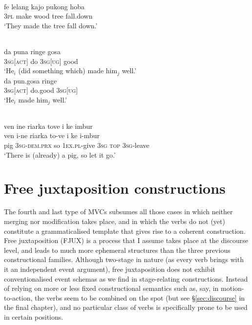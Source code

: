\ea \label{Alorese_15}
\\
\gll fe lelang kajo pukong hoba \\
3\textsc{pl} make wood tree fall.down \\
\glft `They made the tree fall down.'\\ 
\z

\ea
{}\\
\ea \label{Buru_24}
\gll da puna ringe gosa \\
3\textsc{sg}[\textsc{act}] do 3\textsc{sg}[\textsc{ug}] good \\
\glft `He$_i$ (did something which) made him$_j$ well.' \\ 
\ex \label{Buru_25}
\gll da pun.gosa ringe \\ 
3\textsc{sg}[\textsc{act}] do.good 3\textsc{sg}[\textsc{ug}] \\
\glft `He$_i$ made him$_j$ well.'\\ 
\z
\z

\ea \label{Dusner_49}
\\
\glll ven ine riarka tove i ke imbur \\
ven i-ne riarka to-ve i ke i-mbur \\
pig 3\textsc{sg}-\textsc{dem}.\textsc{prx} so 1\textsc{ex}.\textsc{pl}-give 3\textsc{sg} \textsc{top} 3\textsc{sg}-leave \\
\glft `There is (already) a pig, so let it go.'\\
\z

\section{Free juxtaposition constructions} \label{sec:fjux}

The fourth and last type of MVCs subsumes all those cases in which neither merging nor modification takes place, and in which the verbs do not (yet) constitute a grammaticalised template that gives rise to a coherent construction. Free juxtaposition (FJUX) is a process that I assume takes place at the discourse level, and leads to much more ephemeral structures than the three previous constructional families. Although two-stage in nature (as every verb brings with it an independent event argument), free juxtaposition does not exhibit conventionalised event schemas as we find in stage-relating constructions. Instead of relying on more or less fixed constructional semantics such as, say, in motion-to-action, the verbs seem to be combined on the spot (but see §\ref{sec:discourse} in the final chapter), and no particular class of verbs is specifically prone to be used in certain positions. 

